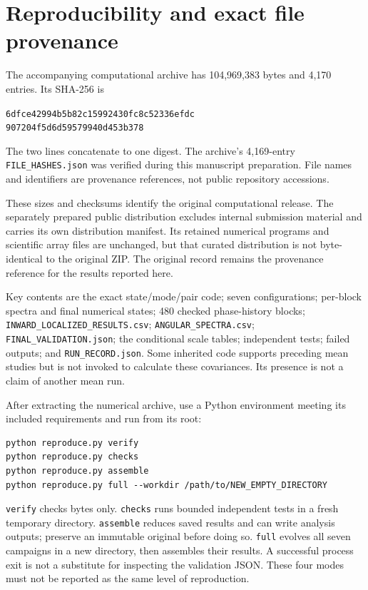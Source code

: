 \documentclass[10pt]{article}
\begin{document}
\section{Reproducibility and exact file provenance}
The accompanying computational archive has 104,969,383 bytes and 4,170 entries. Its SHA-256 is
\begin{center}\small\texttt{6dfce42994b5b82c15992430fc8c52336efdc}\\
\texttt{907204f5d6d59579940d453b378}\normalsize\end{center}
The two lines concatenate to one digest. The archive's 4,169-entry \texttt{FILE\_HASHES.json} was verified during this manuscript preparation. File names and identifiers are provenance references, not public repository accessions.

These sizes and checksums identify the original computational release. The separately prepared public distribution excludes internal submission material and carries its own distribution manifest. Its retained numerical programs and scientific array files are unchanged, but that curated distribution is not byte-identical to the original ZIP. The original record remains the provenance reference for the results reported here.

\begin{sloppypar}
Key contents are the exact state/mode/pair code; seven configurations; per-block spectra and final numerical states; 480 checked phase-history blocks; \nolinkurl{INWARD_LOCALIZED_RESULTS.csv}; \texttt{ANGULAR\_SPECTRA.csv}; \texttt{FINAL\_VALIDATION.json}; the conditional scale tables; independent tests; failed outputs; and \texttt{RUN\_RECORD.json}. Some inherited code supports preceding mean studies but is not invoked to calculate these covariances. Its presence is not a claim of another mean run.
\end{sloppypar}

After extracting the numerical archive, use a Python environment meeting its included requirements and run from its root:
\begin{verbatim}
python reproduce.py verify
python reproduce.py checks
python reproduce.py assemble
python reproduce.py full --workdir /path/to/NEW_EMPTY_DIRECTORY
\end{verbatim}
\texttt{verify} checks bytes only. \texttt{checks} runs bounded independent tests in a fresh temporary directory. \texttt{assemble} reduces saved results and can write analysis outputs; preserve an immutable original before doing so. \texttt{full} evolves all seven campaigns in a new directory, then assembles their results. A successful process exit is not a substitute for inspecting the validation JSON. These four modes must not be reported as the same level of reproduction.
\end{document}
